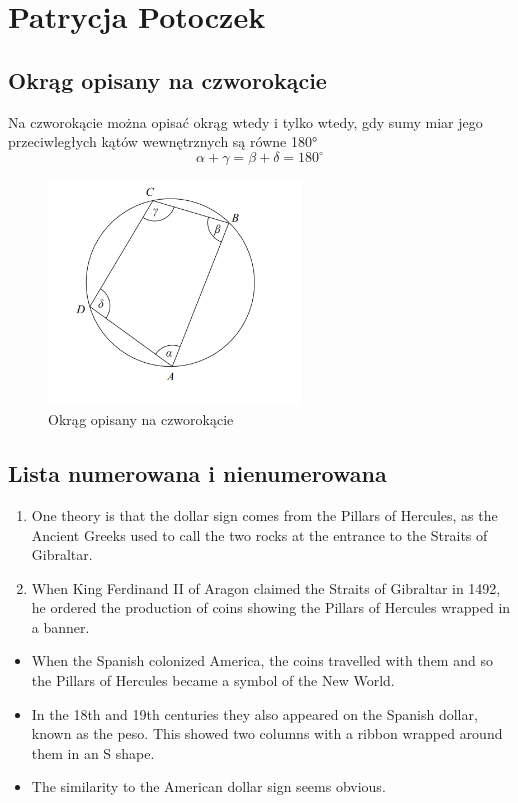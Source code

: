 \section{Patrycja Potoczek}


\subsection{Okrąg opisany na czworokącie}

Na czworokącie można opisać okrąg wtedy i tylko wtedy,
gdy sumy miar jego przeciwległych kątów wewnętrznych są
równe 180°
\[ \alpha + \gamma = \beta + \delta = 180^\circ \]

 \begin{figure}[htbp]
     \centering
     \includegraphics[width=0.6\textwidth]{pictures/okrag_na_czworokacie.jpg}
     \caption{\label{fig:okrag_na_czworokacie}Okrąg opisany na czworokącie}
 \end{figure}




\subsection{Lista numerowana i nienumerowana}

\begin{enumerate}
\item One theory is that the dollar sign comes from the Pillars of Hercules, as the Ancient Greeks
used to call the two rocks at the entrance to the Straits of Gibraltar. 
\item When King Ferdinand II of Aragon claimed the Straits of Gibraltar in 1492, he ordered the production of coins showing the Pillars of Hercules wrapped in a banner. 
\end{enumerate}
\begin{itemize}
\item When the Spanish colonized America, the coins travelled with them and so the Pillars of Hercules became a symbol of the New World. 
\item In the 18th and 19th centuries they also appeared on the Spanish dollar, known as the peso. This showed two columns with a ribbon wrapped around them in an S shape.
\item The similarity to the American dollar sign seems obvious. 
\end{itemize}


